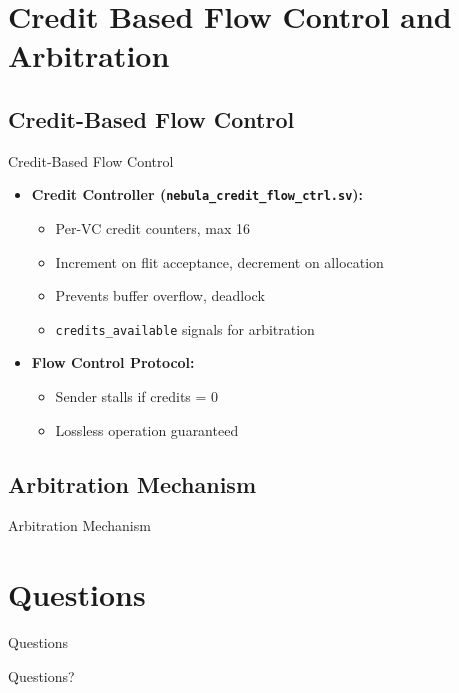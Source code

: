 \documentclass{beamer}
\begin{document}
\section{Credit Based Flow Control and Arbitration}
\subsection{Credit-Based Flow Control}
\begin{frame}{Credit-Based Flow Control}
  \begin{itemize}
    \item \textbf{Credit Controller (\texttt{nebula\_credit\_flow\_ctrl.sv}):}
      \begin{itemize}
        \item Per-VC credit counters, max 16
        \item Increment on flit acceptance, decrement on allocation
        \item Prevents buffer overflow, deadlock
        \item \texttt{credits\_available} signals for arbitration
      \end{itemize}
    \item \textbf{Flow Control Protocol:}
      \begin{itemize}
        \item Sender stalls if credits = 0
        \item Lossless operation guaranteed
      \end{itemize}
  \end{itemize}
\end{frame}

\subsection{Arbitration Mechanism}
\begin{frame}{Arbitration Mechanism}
\end{frame}

\section{Questions}
\begin{frame}{Questions}
  \begin{center}
	\Huge Questions?
  \end{center}
\end{frame}
\end{document}
